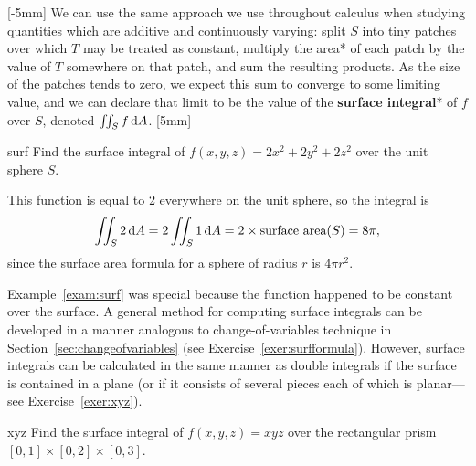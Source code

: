 \documentclass{watsonbook}
\begin{document}
[-5mm]
We can use the same approach we use throughout calculus when studying
quantities which are additive and continuously varying: split $S$ into
tiny patches over which $T$ may be treated as constant,
multiply the area* of each patch by the value of $T$ somewhere on that patch, and
sum the resulting products. As the size of the patches tends to zero,
we expect this sum to converge to some limiting value, and we can
declare that limit to be the value of the \textbf{surface integral}* of $f$ over
$S$, denoted $\iint_S f \, {\mathrm{d}}A$. [5mm]

\begin{example}{}{surf}
  Find the surface integral of $f(x,y,z) = 2x^2 +2y^2 + 2z^2$ over the
  unit sphere $S$. 
\end{example}

\begin{solution}
  This function is equal to 2 everywhere on the unit sphere, so the
  integral is
  \[
    \iint_{S} 2 \,\mathrm{d} A =     2 \iint_{S} 1 \,\mathrm{d} A = 2 \times \text{surface
      area}(S) = 8\pi, 
  \]
  since the surface area formula for a sphere of radius $r$ is $4\pi
  r^2$. 
\end{solution}

Example~\ref{exam:surf} was special because the function happened to
be constant over the surface. A general method for computing surface
integrals can be developed in a manner analogous to
change-of-variables technique in
Section~\ref{sec:changeofvariables} (see Exercise~\ref{exer:surfformula}).
However, surface integrals can be
calculated in the same manner as double integrals if the surface is
contained in a plane (or if it consists of several pieces each of
which is planar---see Exercise~\ref{exer:xyz}). 

\begin{exercise}{}{xyz}
  Find the surface integral of $f(x,y,z) = xyz$ over the rectangular
  prism $[0,1] \times [0,2] \times [0,3]$. 
\end{exercise}
\end{document}

